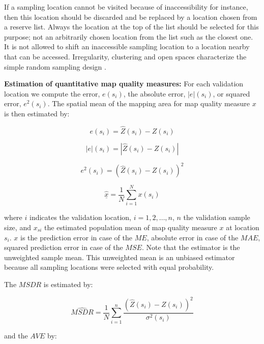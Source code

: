 \documentclass[10pt,b5paper,]{book}
\theoremstyle{definition}
\theoremstyle{definition}
\theoremstyle{definition}
\theoremstyle{remark}
\begin{document}
If a sampling location cannot be visited because of inaccessibility for
instance, then this location should be discarded and be replaced by a
location chosen from a reserve list. Always the location at the top of
the list should be selected for this purpose; not an arbitrarily chosen
location from the list such as the closest one. It is not allowed to
shift an inaccessible sampling location to a location nearby that can be
accessed. Irregularity, clustering and open spaces characterize the
simple random sampling design \citep{de2006sampling}.

\textbf{Estimation of quantitative map quality measures:} For each
validation location we compute the error, \(e(s_i)\), the absolute
error, \(|e|(s_i)\), or squared error, \(e^2(s_i)\). The spatial mean of
the mapping area for map quality measure \(x\) is then estimated by:

\begin{equation}
e(s_i) = \hat{Z}(s_i) - Z(s_i)
\end{equation}

\begin{equation}
|e|(s_i) = |\hat{Z}(s_i) - Z(s_i)|
\end{equation}

\begin{equation}
e^2(s_i) =( \hat{Z}(s_i) - Z(s_i))^2
\end{equation}

\begin{equation}
\underline{\hat{x}} = \frac{1}{N} \sum_{i=1}^{N} x(s_i)
\end{equation}

where \(i\) indicates the validation location, \(i = 1, 2, \dots, n\),
\(n\) the validation sample size, and \(x_{si}\) the estimated
population mean of map quality measure \(x\) at location \(s_i\). \(x\)
is the prediction error in case of the \(ME\), absolute error in case of
the \(MAE\), squared prediction error in case of the \(MSE\). Note that
the estimator is the unweighted sample mean. This unweighted mean is an
unbiased estimator because all sampling locations were selected with
equal probability.

The \(MSDR\) is estimated by:

\begin{equation}
\widehat{M S D R} = \frac{1}{N} \sum_{i=1}^{n} \frac{(\hat{Z}(s_i) - Z(s_i))^2}{\sigma^2(s_i)}
\end{equation}

and the \(AVE\) by:
\end{document}
